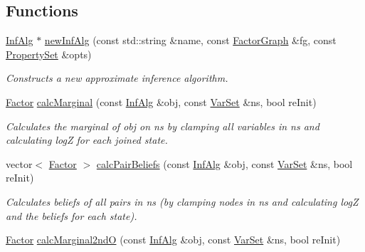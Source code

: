 \subsection*{Functions}
\begin{CompactItemize}
\item 
\hyperlink{classdai_1_1InfAlg}{InfAlg} $\ast$ \hyperlink{namespacedai_4b9e5254e7ec388e69aa68dfc54509e0}{newInfAlg} (const std::string \&name, const \hyperlink{classdai_1_1FactorGraph}{FactorGraph} \&fg, const \hyperlink{classdai_1_1PropertySet}{PropertySet} \&opts)
\begin{CompactList}\small\item\em Constructs a new approximate inference algorithm. \item\end{CompactList}\item 
\hypertarget{namespacedai_aca72feba62fa99197ef6b9f8bc72e3e}{
\hyperlink{classdai_1_1TFactor}{Factor} \hyperlink{namespacedai_aca72feba62fa99197ef6b9f8bc72e3e}{calcMarginal} (const \hyperlink{classdai_1_1InfAlg}{InfAlg} \&obj, const \hyperlink{classdai_1_1VarSet}{VarSet} \&ns, bool reInit)}
\label{namespacedai_aca72feba62fa99197ef6b9f8bc72e3e}

\begin{CompactList}\small\item\em Calculates the marginal of obj on ns by clamping all variables in ns and calculating logZ for each joined state. \item\end{CompactList}\item 
\hypertarget{namespacedai_22940584470b8ef98412e92427fb8a91}{
vector$<$ \hyperlink{classdai_1_1TFactor}{Factor} $>$ \hyperlink{namespacedai_22940584470b8ef98412e92427fb8a91}{calcPairBeliefs} (const \hyperlink{classdai_1_1InfAlg}{InfAlg} \&obj, const \hyperlink{classdai_1_1VarSet}{VarSet} \&ns, bool reInit)}
\label{namespacedai_22940584470b8ef98412e92427fb8a91}

\begin{CompactList}\small\item\em Calculates beliefs of all pairs in ns (by clamping nodes in ns and calculating logZ and the beliefs for each state). \item\end{CompactList}\item 
\hypertarget{namespacedai_3ef899f27a3662e771e978bca7615f33}{
\hyperlink{classdai_1_1TFactor}{Factor} \hyperlink{namespacedai_3ef899f27a3662e771e978bca7615f33}{calcMarginal2ndO} (const \hyperlink{classdai_1_1InfAlg}{InfAlg} \&obj, const \hyperlink{classdai_1_1VarSet}{VarSet} \&ns, bool reInit)}
\label{namespacedai_3ef899f27a3662e771e978bca7615f33}


\end{CompactItemize}
